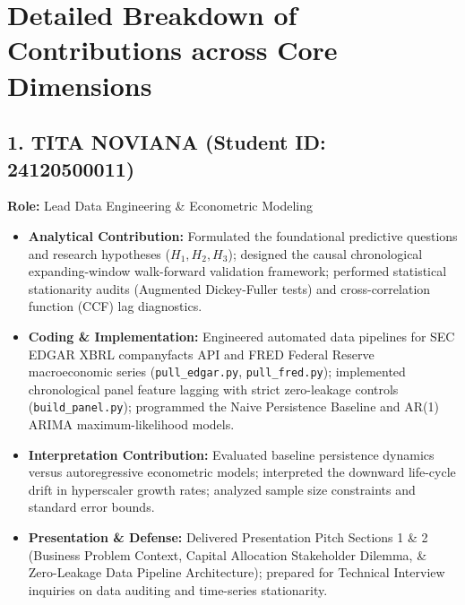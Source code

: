 \documentclass[11pt,a4paper]{article}
\begin{document}
\section{Detailed Breakdown of Contributions across Core Dimensions}

\subsection{1. TITA NOVIANA (Student ID: 24120500011)}
\textbf{Role:} Lead Data Engineering \& Econometric Modeling
\begin{itemize}[leftmargin=1.5em, itemsep=0.2em]
    \item \textbf{Analytical Contribution:} Formulated the foundational predictive questions and research hypotheses ($H_1, H_2, H_3$); designed the causal chronological expanding-window walk-forward validation framework; performed statistical stationarity audits (Augmented Dickey-Fuller tests) and cross-correlation function (CCF) lag diagnostics.
    \item \textbf{Coding \& Implementation:} Engineered automated data pipelines for SEC EDGAR XBRL companyfacts API and FRED Federal Reserve macroeconomic series (\texttt{pull\_edgar.py}, \texttt{pull\_fred.py}); implemented chronological panel feature lagging with strict zero-leakage controls (\texttt{build\_panel.py}); programmed the Naive Persistence Baseline and AR(1) ARIMA maximum-likelihood models.
    \item \textbf{Interpretation Contribution:} Evaluated baseline persistence dynamics versus autoregressive econometric models; interpreted the downward life-cycle drift in hyperscaler growth rates; analyzed sample size constraints and standard error bounds.
    \item \textbf{Presentation \& Defense:} Delivered Presentation Pitch Sections 1 \& 2 (Business Problem Context, Capital Allocation Stakeholder Dilemma, & Zero-Leakage Data Pipeline Architecture); prepared for Technical Interview inquiries on data auditing and time-series stationarity.
\end{itemize}

\vspace{0.4em}
\end{document}
